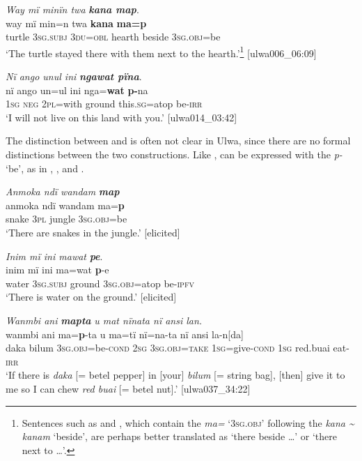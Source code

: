 \ea%
    \label{ex:pred:17}
          \textit{Way mï minïn twa} \textbf{\textit{kana map}}.\\
\gll way  mï      min=n twa \textbf{kana} \textbf{ma=p}\\
    turtle  3\textsc{sg.subj}  3\textsc{du=obl}  hearth  beside  3\textsc{sg.obj}=be\\
\glt `The turtle stayed there with them next to the hearth.’\footnote{Sentences such as  and , which contain the  \textit{ma=} ‘\textsc{3sg.obj}’ following the  \textit{kana {\textasciitilde} kanam} ‘beside’, are perhaps better translated as ‘there beside …’ or ‘there next to …’.} [ulwa006\_06:09]
\z

\ea%
    \label{ex:pred:18}
          \textit{Nï ango unul ini} \textbf{\textit{ngawat pïna}}.\\
\gll nï    ango  un=ul    ini    nga=\textbf{wat}    \textbf{p-}na\\
    1\textsc{sg}  \textsc{neg}  2\textsc{pl=}with  ground  this.\textsc{sg}=atop  be-\textsc{irr}\\
\glt `I will not live on this land with you.’ [ulwa014\_03:42]
\z

  The distinction between  and  is often not clear in Ulwa, since there are no formal distinctions between the two constructions. Like ,  can be expressed with the  \textit{p-} ‘be’, as in , , and .

\ea%
    \label{ex:pred:19}
          \textit{Anmoka ndï wandam} \textbf{\textit{map}}\\
\gll    anmoka  ndï  wandam  ma=\textbf{p}\\
    snake    3\textsc{pl}  jungle    3\textsc{sg.obj}=be\\
\glt `There are snakes in the jungle.’ [elicited]
\z

\ea%
    \label{ex:pred:20}
          \textit{Inim mï ini mawat} \textbf{\textit{pe}}.\\
\gll inim  mï      ini    ma=wat    \textbf{p}{}-e\\
    water  3\textsc{sg.subj}  ground  3\textsc{sg.obj}=atop  be\textsc{{}-ipfv}\\
\glt `There is water on the ground.’ [elicited]
\z

\ea%
    \label{ex:pred:21}
          \textit{Wanmbi ani} \textbf{\textit{mapta}} \textit{u mat nïnata nï ansi lan.}\\
\gll    wanmbi  ani    ma=\textbf{p}{}-ta      u    ma=tï     nï=na-ta      nï    ansi    la{}-n[da]\\
    daka    bilum  3\textsc{sg.obj}=be\textsc{{}-cond}  \textsc{2sg}  \textsc{3sg.obj=take}  1\textsc{sg}=give-\textsc{cond}  1\textsc{sg}  red.buai  eat-\textsc{irr}\\
\glt `If there is \textit{daka} [= betel pepper] in [your] \textit{bilum} [= string bag], [then] give it to me so I can chew \textit{red buai} [= betel nut].’ [ulwa037\_34:22]
\z

